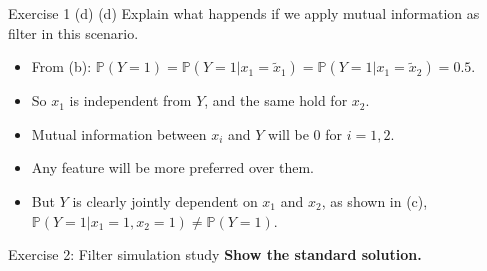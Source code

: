 \documentclass[aspectratio=169]{beamer}
\newcommand{\prob}[1]{\mathbb{P}\left(#1\right)}
\newcommand{\xone}{x_1}
\newcommand{\xtwo}{x_2}
\newcommand{\txone}{\tilde{x}_1}
\newcommand{\txtwo}{\tilde{x}_2}
\begin{document}
\begin{frame}{Exercise 1 (d)}
	(d) Explain what happends if we apply mutual information as filter in this scenario.
	\begin{itemize}
		\item<2-> From (b): $\prob{Y = 1} = \prob{Y = 1 | \xone = \txone} = \prob{Y = 1 | \xone = \txtwo} = 0.5$.
		\item<3-> So $\xone$ is independent from $Y$, and the same hold for $\xtwo$.
		\item<4-> Mutual information between $x_i$ and $Y$ will be $0$ for $i = 1, 2$.
		\item<5-> Any feature will be more preferred over them.
		\item<6-> But $Y$ is clearly jointly dependent on $x_1$ and $x_2$, as shown in (c), $\prob{Y=1 | \xone = 1, \xtwo = 1} \neq \prob{Y=1}$.
	\end{itemize}
\end{frame}

\begin{frame}{Exercise 2: Filter simulation study}
	\textbf{Show the standard solution.}
\end{frame}
\end{document}
